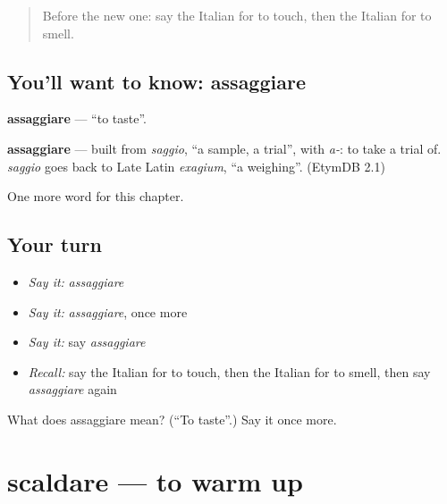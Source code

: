 \label{lesson:IT-C176-assaggiare}



\begin{quote}
Before the new one: say the Italian for to touch, then the Italian for to smell.
\end{quote}

\subsection*{You'll want to know: assaggiare}
\textbf{assaggiare} — \textquotedblleft{}to taste\textquotedblright{}.

\begin{cousinweb}
\textbf{assaggiare} — built from \emph{saggio}, \textquotedblleft{}a sample, a trial\textquotedblright{}, with \emph{a-}: to take a trial of. \emph{saggio} goes back to Late Latin \emph{exagium}, \textquotedblleft{}a weighing\textquotedblright{}. (EtymDB 2.1)
\end{cousinweb}

\begin{grammarlens}[title={What you've built}]
One more word for this chapter.
\end{grammarlens}

\subsection*{Your turn}
\begin{itemize}
\raggedright
  \item \emph{Say it:} \emph{assaggiare}
  \item \emph{Say it:} \emph{assaggiare}, once more
  \item \emph{Say it:} say \emph{assaggiare}
  \item \emph{Recall:} say the Italian for to touch, then the Italian for to smell, then say \emph{assaggiare} again
\end{itemize}

\begin{tcolorbox}[breakable,colback=teal!4,colframe=teal!35!black,title={Before you move on}]
What does assaggiare mean? (\textquotedblleft{}To taste\textquotedblright{}.) Say it once more.
\end{tcolorbox}
\section[scaldare]{scaldare — to warm up}

\label{lesson:IT-C176-scaldare}



